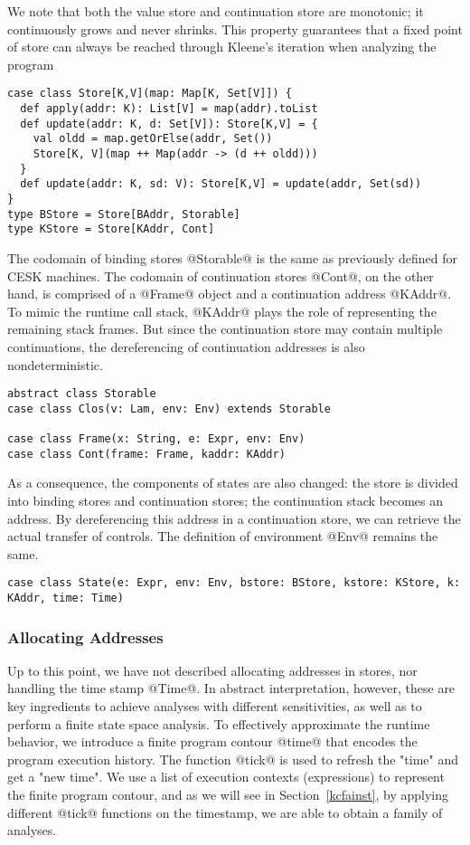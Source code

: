 \documentclass[acmsmall]{acmart}\settopmatter{}
\begin{document}
We note that both the value store and continuation store are monotonic;
it continuously grows and never shrinks. This property guarantees that
a fixed point of store can always be reached through Kleene's
iteration when analyzing the program

\begin{lstlisting}
case class Store[K,V](map: Map[K, Set[V]]) {
  def apply(addr: K): List[V] = map(addr).toList
  def update(addr: K, d: Set[V]): Store[K,V] = {
    val oldd = map.getOrElse(addr, Set())
    Store[K, V](map ++ Map(addr -> (d ++ oldd)))
  }
  def update(addr: K, sd: V): Store[K,V] = update(addr, Set(sd))
}
type BStore = Store[BAddr, Storable]
type KStore = Store[KAddr, Cont]
\end{lstlisting}

The codomain of binding stores @Storable@ is the same as previously defined for CESK 
machines. The codomain of continuation stores @Cont@, on the other hand, is comprised of
a @Frame@ object and a continuation address @KAddr@. To mimic the runtime call stack, 
@KAddr@ plays the role of representing the remaining stack frames.
But since the continuation store may contain multiple continuations, the dereferencing 
of continuation addresses is also nondeterministic.

\begin{lstlisting}
abstract class Storable
case class Clos(v: Lam, env: Env) extends Storable

case class Frame(x: String, e: Expr, env: Env)
case class Cont(frame: Frame, kaddr: KAddr)
\end{lstlisting}

As a consequence, the components of states are also changed: the store is divided
into binding stores and continuation stores; the continuation stack becomes an address.
By dereferencing this address in a continuation store, we can retrieve the actual 
transfer of controls. The definition of environment @Env@ remains the same.

\begin{lstlisting}
case class State(e: Expr, env: Env, bstore: BStore, kstore: KStore, k: KAddr, time: Time)
\end{lstlisting}

\subsubsection{Allocating Addresses}
Up to this point, we have not described allocating addresses in stores,
nor handling the time stamp @Time@.
In abstract interpretation, however, these are key ingredients to achieve
analyses with different sensitivities, as well as to perform a finite
state space analysis\cite{Gilray:2016:ACP:2951913.2951936}.
To effectively approximate the runtime behavior, we introduce a finite
program contour @time@ that encodes the program execution history.
The function @tick@ is used to refresh the "time" and get a "new time".
We use a list of execution contexts (expressions) to represent the finite 
program contour, and as we will see in Section~\ref{kcfainst}, by applying 
different @tick@ functions on the timestamp, we are able to obtain a 
family of analyses.
\end{document}
